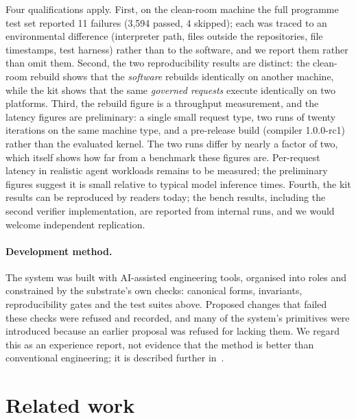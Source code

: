 \documentclass[11pt,a4paper]{article}
\begin{document}
Four qualifications apply. First, on the clean-room machine the full programme test set reported 11 failures (3{,}594 passed, 4 skipped); each was traced to an environmental difference (interpreter path, files outside the repositories, file timestamps, test harness) rather than to the software, and we report them rather than omit them. Second, the two reproducibility results are distinct: the clean-room rebuild shows that the \emph{software} rebuilds identically on another machine, while the kit shows that the same \emph{governed requests} execute identically on two platforms. Third, the rebuild figure is a throughput measurement, and the latency figures are preliminary: a single small request type, two runs of twenty iterations on the same machine type, and a pre-release build (compiler 1.0.0-rc1) rather than the evaluated kernel. The two runs differ by nearly a factor of two, which itself shows how far from a benchmark these figures are. Per-request latency in realistic agent workloads remains to be measured; the preliminary figures suggest it is small relative to typical model inference times. Fourth, the kit results can be reproduced by readers today; the bench results, including the second verifier implementation, are reported from internal runs, and we would welcome independent replication.

\paragraph{Development method.} The system was built with AI-assisted engineering tools, organised into roles and constrained by the substrate's own checks: canonical forms, invariants, reproducibility gates and the test suites above. Proposed changes that failed these checks were refused and recorded, and many of the system's primitives were introduced because an earlier proposal was refused for lacking them. We regard this as an experience report, not evidence that the method is better than conventional engineering; it is described further in~\citep{boundryresearch}.

\section{Related work}\label{sec:related}
\end{document}
